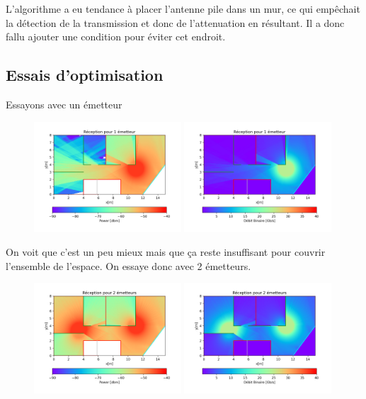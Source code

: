 \documentclass[sn-mathphys-num]{sn-jnl}%
\theoremstyle{thmstyleone}%
\theoremstyle{thmstyletwo}%
\theoremstyle{thmstylethree}%
\begin{document}
L'algorithme a eu tendance à placer l'antenne pile dans un mur, ce qui empêchait la détection
de la transmission et donc de l'attenuation en résultant. Il a donc fallu ajouter une condition
pour éviter cet endroit.

\subsection{Essais d'optimisation}

Essayons avec un émetteur

\begin{figure}[H]
    \centering
    \includegraphics[width=0.49\textwidth]{images/opti/1.png}
    \includegraphics[width=0.49\textwidth]{images/opti/1_bin.png}
\end{figure}

On voit que c'est un peu mieux mais que ça reste insuffisant pour
couvrir l'ensemble de l'espace. On essaye donc avec 2 émetteurs.

\begin{figure}[H]
    \centering
    \includegraphics[width=0.49\textwidth]{images/opti/2.png}
    \includegraphics[width=0.49\textwidth]{images/opti/2_bin.png}
\end{figure}
\end{document}
